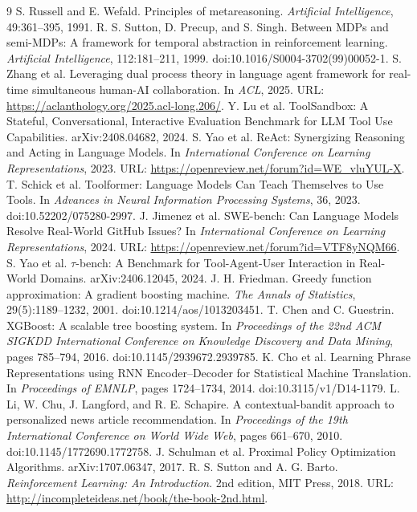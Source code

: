 \documentclass[11pt]{article}
\begin{document}
\begin{thebibliography}{9}
 S. Russell and E. Wefald. Principles of metareasoning. \emph{Artificial Intelligence}, 49:361--395, 1991.
 R. S. Sutton, D. Precup, and S. Singh. Between MDPs and semi-MDPs: A framework for temporal abstraction in reinforcement learning. \emph{Artificial Intelligence}, 112:181--211, 1999. doi:10.1016/S0004-3702(99)00052-1.
 S. Zhang et al. Leveraging dual process theory in language agent framework for real-time simultaneous human-AI collaboration. In \emph{ACL}, 2025. URL: \url{https://aclanthology.org/2025.acl-long.206/}.
 Y. Lu et al. ToolSandbox: A Stateful, Conversational, Interactive Evaluation Benchmark for LLM Tool Use Capabilities. arXiv:2408.04682, 2024.
 S. Yao et al. ReAct: Synergizing Reasoning and Acting in Language Models. In \emph{International Conference on Learning Representations}, 2023. URL: \url{https://openreview.net/forum?id=WE_vluYUL-X}.
 T. Schick et al. Toolformer: Language Models Can Teach Themselves to Use Tools. In \emph{Advances in Neural Information Processing Systems}, 36, 2023. doi:10.52202/075280-2997.
 J. Jimenez et al. SWE-bench: Can Language Models Resolve Real-World GitHub Issues? In \emph{International Conference on Learning Representations}, 2024. URL: \url{https://openreview.net/forum?id=VTF8yNQM66}.
 S. Yao et al. $\tau$-bench: A Benchmark for Tool-Agent-User Interaction in Real-World Domains. arXiv:2406.12045, 2024.
 J. H. Friedman. Greedy function approximation: A gradient boosting machine. \emph{The Annals of Statistics}, 29(5):1189--1232, 2001. doi:10.1214/aos/1013203451.
 T. Chen and C. Guestrin. XGBoost: A scalable tree boosting system. In \emph{Proceedings of the 22nd ACM SIGKDD International Conference on Knowledge Discovery and Data Mining}, pages 785--794, 2016. doi:10.1145/2939672.2939785.
 K. Cho et al. Learning Phrase Representations using RNN Encoder--Decoder for Statistical Machine Translation. In \emph{Proceedings of EMNLP}, pages 1724--1734, 2014. doi:10.3115/v1/D14-1179.
 L. Li, W. Chu, J. Langford, and R. E. Schapire. A contextual-bandit approach to personalized news article recommendation. In \emph{Proceedings of the 19th International Conference on World Wide Web}, pages 661--670, 2010. doi:10.1145/1772690.1772758.
 J. Schulman et al. Proximal Policy Optimization Algorithms. arXiv:1707.06347, 2017.
 R. S. Sutton and A. G. Barto. \emph{Reinforcement Learning: An Introduction}. 2nd edition, MIT Press, 2018. URL: \url{http://incompleteideas.net/book/the-book-2nd.html}.

\end{thebibliography}
\end{document}
